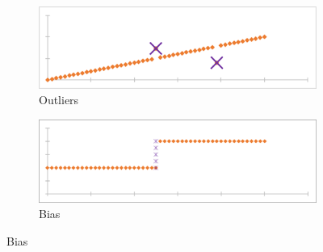 \documentclass[main.tex]{subfiles}
\begin{document}
    \begin{figure}[h]
      \begin{subfigure}{0.48\linewidth}
        \centering
        \includegraphics[width=0.9\linewidth]{figures/outlierPOI}
        \caption{Outliers}
        \label{fig:poi:outlier}
      \end{subfigure}
      \begin{subfigure}{0.48\linewidth}
        \centering
        \includegraphics[width=0.9\linewidth]{figures/biasPOI}
        \caption{Bias}
        \label{fig:poi:bias}
      \end{subfigure}
      

\end{figure}
\end{document}
